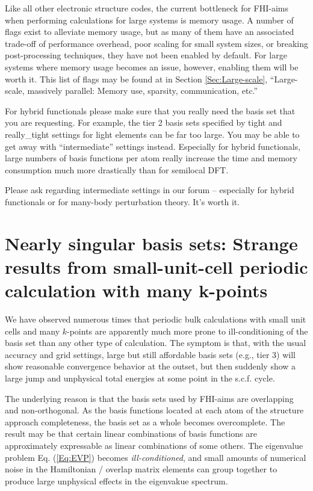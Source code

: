 Like all other electronic structure codes, the current bottleneck for
FHI-aims when performing calculations for large systems is memory usage.
A number of flags exist to alleviate memory usage, but as many of them
have an associated trade-off of performance overhead, poor scaling for
small system sizes, or breaking post-processing techniques, they have not
been enabled by default. For large systems where memory usage becomes
an issue, however, enabling them will be worth it. This list of flags
may be found at in Section \ref{Sec:Large-scale}, ``Large-scale, massively
parallel: Memory use, sparsity, communication, etc.''

For hybrid functionals please make sure that you really need the basis set
that you are requesting. For example, the tier 2 basis sets specified by
tight and really\_tight settings for light elements can be far too large.
You may be able to get away with ``intermediate'' settings instead. Especially
for hybrid functionals, large numbers of basis functions per atom really
increase the time and memory consumption much more drastically than for
semilocal DFT.

Please ask regarding intermediate settings in our forum -- especially for
hybrid functionals or for many-body perturbation theory. It's worth it.

\section{Nearly singular basis sets: Strange results from small-unit-cell
periodic calculation with many k-points}

We have observed numerous times that periodic bulk calculations with
small unit cells and many $k$-points are apparently much more prone to
ill-conditioning of the basis set than any other type of
calculation. The symptom is that, with the usual accuracy and grid
settings, large but still affordable basis sets (e.g., tier 3) will
show reasonable convergence behavior at the outset, but then suddenly
show a large jump and unphysical total energies at some point in the
s.c.f. cycle.

The underlying reason is that the basis sets used by FHI-aims are
overlapping and non-orthogonal. As the basis functions located at each
atom of the structure approach completeness, the basis set as a whole
becomes overcomplete. The result may be that certain linear
combinations of basis functions are approximately expressable as
linear combinations of some others. The eigenvalue problem
Eq. (\ref{Eq:EVP}) becomes \emph{ill-conditioned}, and small amounts of
numerical noise in the Hamiltonian / overlap matrix elements can
group together to produce large unphysical effects in the eigenvakue
spectrum.

